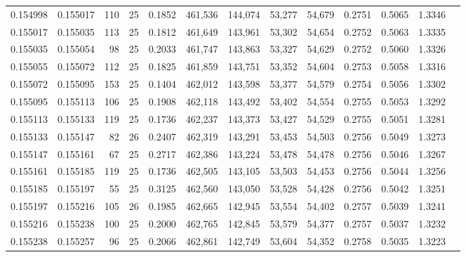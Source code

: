 \begin{tabular}{rrrrrrrrrrrrr}
0.154998 & 0.155017 &   110 &  25 &                                     0.1852 & 461,536 & 144,074 &  53,277 &  54,679 & 0.2751 & 0.5065 & 1.3346 \\
0.155017 & 0.155035 &   113 &  25 &                                     0.1812 & 461,649 & 143,961 &  53,302 &  54,654 & 0.2752 & 0.5063 & 1.3335 \\
0.155035 & 0.155054 &    98 &  25 &                                     0.2033 & 461,747 & 143,863 &  53,327 &  54,629 & 0.2752 & 0.5060 & 1.3326 \\
0.155055 & 0.155072 &   112 &  25 &                                     0.1825 & 461,859 & 143,751 &  53,352 &  54,604 & 0.2753 & 0.5058 & 1.3316 \\
0.155072 & 0.155095 &   153 &  25 &                                     0.1404 & 462,012 & 143,598 &  53,377 &  54,579 & 0.2754 & 0.5056 & 1.3302 \\
0.155095 & 0.155113 &   106 &  25 &                                     0.1908 & 462,118 & 143,492 &  53,402 &  54,554 & 0.2755 & 0.5053 & 1.3292 \\
0.155113 & 0.155133 &   119 &  25 &                                     0.1736 & 462,237 & 143,373 &  53,427 &  54,529 & 0.2755 & 0.5051 & 1.3281 \\
0.155133 & 0.155147 &    82 &  26 &                                     0.2407 & 462,319 & 143,291 &  53,453 &  54,503 & 0.2756 & 0.5049 & 1.3273 \\
0.155147 & 0.155161 &    67 &  25 &                                     0.2717 & 462,386 & 143,224 &  53,478 &  54,478 & 0.2756 & 0.5046 & 1.3267 \\
0.155161 & 0.155185 &   119 &  25 &                                     0.1736 & 462,505 & 143,105 &  53,503 &  54,453 & 0.2756 & 0.5044 & 1.3256 \\
0.155185 & 0.155197 &    55 &  25 &                                     0.3125 & 462,560 & 143,050 &  53,528 &  54,428 & 0.2756 & 0.5042 & 1.3251 \\
0.155197 & 0.155216 &   105 &  26 &                                     0.1985 & 462,665 & 142,945 &  53,554 &  54,402 & 0.2757 & 0.5039 & 1.3241 \\
0.155216 & 0.155238 &   100 &  25 &                                     0.2000 & 462,765 & 142,845 &  53,579 &  54,377 & 0.2757 & 0.5037 & 1.3232 \\
0.155238 & 0.155257 &    96 &  25 &                                     0.2066 & 462,861 & 142,749 &  53,604 &  54,352 & 0.2758 & 0.5035 & 1.3223 \\

\end{tabular}

